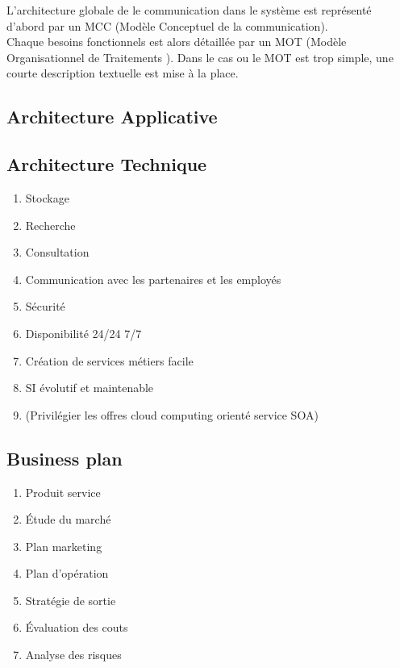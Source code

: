 L'architecture globale de le communication dans le système est représenté
d'abord par un MCC (Modèle Conceptuel de la communication). \\

Chaque besoins fonctionnels est alors détaillée par un MOT (Modèle
Organisationnel de Traitements ). Dans le cas ou le MOT est trop simple, une
courte description textuelle est mise à la place. \\

\subsection{Architecture Applicative}


\subsection{Architecture Technique}
\begin{enumerate}
  \item Stockage
  \item Recherche
  \item Consultation
  \item Communication avec les partenaires et les employés
  \item Sécurité
  \item Disponibilité 24/24 7/7
  \item Création de services métiers facile
  \item SI évolutif et maintenable
  \item (Privilégier les offres cloud computing orienté service SOA)
\end{enumerate}

\subsection{Business plan}
\begin{enumerate}
  \item Produit service
  \item Étude du marché
  \item Plan marketing
  \item Plan d'opération
  \item Stratégie de sortie
  \item Évaluation des couts
  \item Analyse des risques
\end{enumerate}

